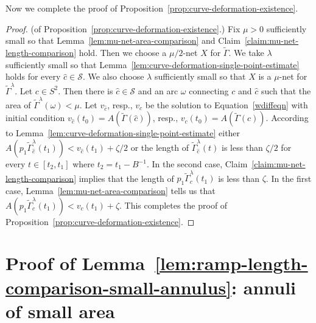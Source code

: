 Now we complete the proof of Proposition~\ref{prop:curve-deformation-existence}.

\begin{proof}
 (of Proposition~\ref{prop:curve-deformation-existence}.)
Fix $\mu>0$ sufficiently small so that Lemma~\ref{lem:mu-net-area-comparison} and
Claim~\ref{claim:mu-net-length-comparison} hold. Then we choose a $\mu/2$-net $X$ for
$\widetilde\Gamma$. We take $\lambda$ sufficiently small so that
Lemma~\ref{lem:curve-deformation-single-point-estimate} holds for every $\hat c\in {\mathcal S}$. We
also choose $\lambda$ sufficiently small so that $X$ is a $\mu$-net
for $\widetilde\Gamma^\lambda$. Let $c\in S^2$. Then there is $\hat
c\in {\mathcal S}$ and an arc $\omega$ connecting $c$ and $\hat c$
such that the area of $\widetilde\Gamma^\lambda(\omega)<\mu$. Let
$v_{\hat c}$, resp., $v_c$ be the solution to
Equation~\ref{wdiffeqn} with initial condition $v_{\hat
c}(t_0)=A(\widetilde\Gamma({\hat c}))$, resp.,
$v_c(t_0)=A(\widetilde\Gamma(c))$. According to
Lemma~\ref{lem:curve-deformation-single-point-estimate} either $A(p_1\widetilde\Gamma_{\hat
c}^\lambda(t_1))<v_{\hat c}(t_1)+\zeta/2$ or the length of
$\widetilde\Gamma_{\hat c}^\lambda(t)$ is less than $\zeta/2$ for
every $t\in [t_2,t_1]$ where $t_2=t_1-B^{-1}$. In the second case,
Claim~\ref{claim:mu-net-length-comparison} implies that the length of
$p_1\widetilde\Gamma_c^\lambda(t_1)$ is less than $\zeta$. In the
first case, Lemma~\ref{lem:mu-net-area-comparison} tells us that
$A(p_1\widetilde\Gamma_c^\lambda(t_1))<v_c(t_1)+\zeta$. This
completes the proof of Proposition~\ref{prop:curve-deformation-existence}.
\end{proof}


\section{Proof of Lemma~{\ref{lem:ramp-length-comparison-small-annulus}}: annuli of small area}\label{18.5}

